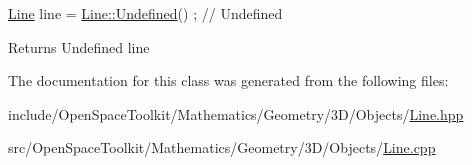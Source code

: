 \begin{DoxyCode}
\hyperlink{classostk_1_1math_1_1geom_1_1d3_1_1objects_1_1_line_a9ebdaaf67a4bd91780808f8683463ebe}{Line} line = \hyperlink{classostk_1_1math_1_1geom_1_1d3_1_1objects_1_1_line_aa22d1d366cfaf4083977a332de24f621}{Line::Undefined}() ; \textcolor{comment}{// Undefined}
\end{DoxyCode}


\begin{DoxyReturn}{Returns}
Undefined line 
\end{DoxyReturn}


The documentation for this class was generated from the following files\+:\begin{DoxyCompactItemize}
\item 
include/\+Open\+Space\+Toolkit/\+Mathematics/\+Geometry/3\+D/\+Objects/\hyperlink{3_d_2_objects_2_line_8hpp}{Line.\+hpp}\item 
src/\+Open\+Space\+Toolkit/\+Mathematics/\+Geometry/3\+D/\+Objects/\hyperlink{3_d_2_objects_2_line_8cpp}{Line.\+cpp}\end{DoxyCompactItemize}
